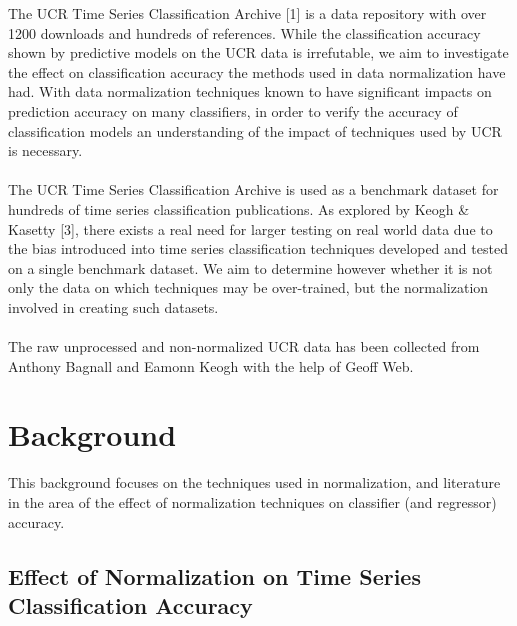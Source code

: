 \documentclass[10pt,a4paper]{article}
\begin{document}
The UCR Time Series Classification Archive [1] is a data repository with over 1200 downloads and hundreds of references. 
While the classification accuracy shown by predictive models on the UCR data is irrefutable, we aim to investigate the effect on classification accuracy the methods used in data normalization have had. 
With data normalization techniques known to have significant impacts on prediction accuracy on many classifiers, in order to verify the accuracy of classification models an understanding of the impact of techniques used by UCR is necessary.
\\\\
The UCR Time Series Classification Archive is used as a benchmark dataset for hundreds of time series classification publications.
As explored by Keogh \& Kasetty [3], there exists a real need for larger testing on real world data due to the bias introduced into time series classification techniques developed and tested on a single benchmark dataset.
We aim to determine however whether it is not only the data on which techniques may be over-trained, but the normalization involved in creating such datasets.
\\\\
The raw unprocessed and non-normalized UCR data has been collected from Anthony Bagnall and Eamonn Keogh with the help of Geoff Web.


\section{Background}

This background focuses on the techniques used in normalization, and literature in the area of the effect of normalization techniques on classifier (and regressor) accuracy.

\subsection{Effect of Normalization on Time Series Classification Accuracy}
\end{document}
